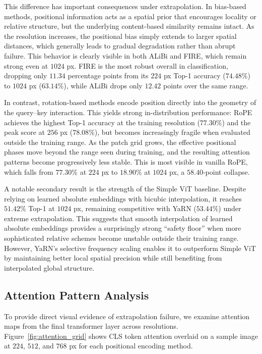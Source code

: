 This difference has important consequences under extrapolation. In bias-based methods, positional
information acts as a spatial prior that encourages locality or relative structure, but the
underlying content-based similarity remains intact. As the resolution increases, the positional
bias simply extends to larger spatial distances, which generally leads to gradual degradation
rather than abrupt failure. This behavior is clearly visible in both ALiBi and FIRE, which remain
strong even at $1024$ px. FIRE is the most robust overall in classification, dropping only
$11.34$ percentage points from its $224$ px Top-1 accuracy ($74.48\%$) to $1024$ px
($63.14\%$), while ALiBi drops only $12.42$ points over the same range.

In contrast, rotation-based methods encode position directly into the geometry of the query--key
interaction. This yields strong in-distribution performance: RoPE achieves the highest Top-1
accuracy at the training resolution ($77.30\%$) and the peak score at $256$ px ($78.08\%$), but
becomes increasingly fragile when evaluated outside the training range. As the patch grid grows,
the effective positional phases move beyond the range seen during training, and the resulting
attention patterns become progressively less stable. This is most visible in vanilla RoPE, which
falls from $77.30\%$ at $224$ px to $18.90\%$ at $1024$ px, a $58.40$-point collapse.

A notable secondary result is the strength of the Simple ViT baseline. Despite relying on learned
absolute embeddings with bicubic interpolation, it reaches $51.42\%$ Top-1 at $1024$ px,
remaining competitive with YaRN ($53.44\%$) under extreme extrapolation. This
suggests that smooth interpolation of learned absolute embeddings provides a surprisingly strong
``safety floor'' when more sophisticated relative schemes become unstable outside their training
range. However, YaRN's selective frequency scaling enables it to outperform Simple ViT by
maintaining better local spatial precision while still benefiting from interpolated global structure.

\subsection{Attention Pattern Analysis}

To provide direct visual evidence of extrapolation failure, we examine attention maps from the final
transformer layer across resolutions. Figure~\ref{fig:attention_grid} shows CLS token attention
overlaid on a sample image at $224$, $512$, and $768$ px for each positional encoding method.


